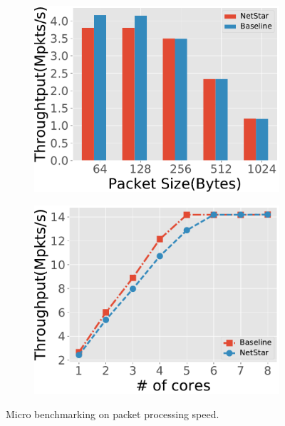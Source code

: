 \begin{figure}[!h]
  \begin{subfigure}[t]{0.49\linewidth}
    \centering
    \includegraphics[width=\columnwidth]{chap-netstar/figure_src/Raw_forwarding_performance.pdf}
    \caption{}\label{fig:eval1.1}
  \end{subfigure}\hfill
  \begin{subfigure}[t]{0.49\linewidth}
    \centering
    \includegraphics[width=\columnwidth]{chap-netstar/figure_src/scalability.pdf}
    \caption{}\label{fig:eval1.2}
  \end{subfigure}
\caption{Micro benchmarking on packet processing speed.}
\label{fig:eval1}
\end{figure}


